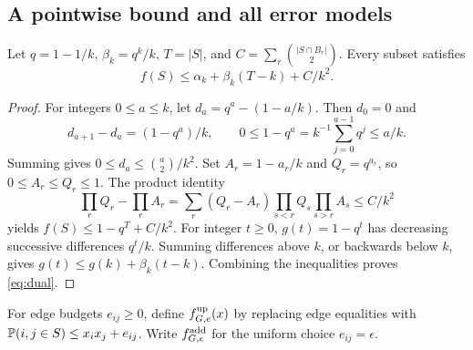 \subsection{A pointwise bound and all error models}\label{sec:certificate}
\begin{lemma}\label{lem:dual}
Let \(q=1-1/k\), \(\beta_k=q^k/k\), \(T=|S|\), and
\(C=\sum_r\binom{|S\cap B_r|}{2}\). Every subset satisfies
\begin{equation}\label{eq:dual}
 f(S)\leq\alpha_k+\beta_k(T-k)+C/k^2.
\end{equation}
\end{lemma}
\begin{proof}
For integers \(0\leq a\leq k\), let \(d_a=q^a-(1-a/k)\).
Then \(d_0=0\) and
\[
 d_{a+1}-d_a=(1-q^a)/k,\qquad
 0\leq1-q^a=k^{-1}\sum_{j=0}^{a-1}q^j\leq a/k.
\]
Summing gives \(0\leq d_a\leq\binom a2/k^2\).
Set \(A_r=1-a_r/k\) and \(Q_r=q^{a_r}\), so
\(0\leq A_r\leq Q_r\leq1\). The product identity
\[
 \prod_rQ_r-\prod_rA_r
 =\sum_r(Q_r-A_r)\prod_{s<r}Q_s\prod_{s>r}A_s\leq C/k^2
\]
yields \(f(S)\leq1-q^T+C/k^2\).
For integer \(t\geq0\), \(g(t)=1-q^t\) has decreasing successive
differences \(q^t/k\). Summing differences above \(k\), or backwards
below \(k\), gives
\(g(t)\leq g(k)+\beta_k(t-k)\). Combining the inequalities proves
\eqref{eq:dual}.
\end{proof}

For edge budgets \(e_{ij}\geq0\), define \(f_{G,e}^{\mathrm{up}}(x)\) by
replacing edge equalities with \(\mathbb P(i,j\in S)\leq x_ix_j+e_{ij}\).
Write \(f_{G,\epsilon}^{\mathrm{add}}\) for the uniform choice \(e_{ij}=\epsilon\).

